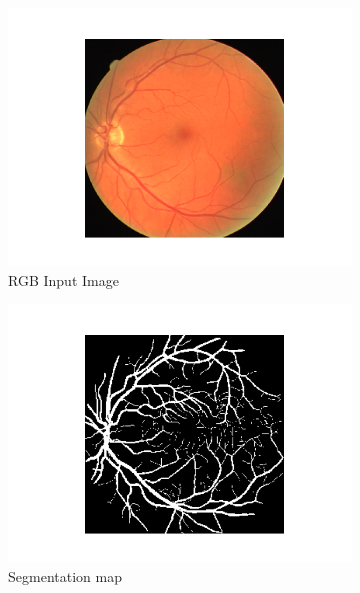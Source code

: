 \documentclass[onecolumn]{article}
\begin{document}
 \begin{figure}[h!]
    \centering
     \begin{subfigure}{0.49\textwidth}
         \includegraphics[width=\textwidth]{figures/ex_dist1.png}
         \caption{RGB Input Image}
     \end{subfigure}
     \hfill
     \begin{subfigure}{0.49\textwidth}
     \centering
         \includegraphics[width=\textwidth]{figures/ex_dist2.png}
         \caption{Segmentation map}
     \end{subfigure}
     \begin{subfigure}{0.44\textwidth}
     

\end{subfigure}
\end{figure}
\end{document}
